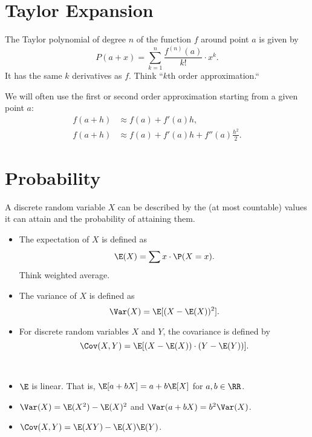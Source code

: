 \documentclass[oneside,reqno,letterpaper]{amsart}
\begin{document}
\section{Taylor Expansion}
\begin{definition}
  The Taylor polynomial of degree \(n\) of the function \(f\) around point \(a\) is given by 
  \[
    P(a + x) = \sum_{k = 1}^{n} \frac{f^{(n)}(a)}{k!} \cdot x^{k} . 
  \] 
  It has the same \(k\) derivatives as \(f\). 
  Think ``\(k\)th order approximation.``
\end{definition}
\begin{remark}
  We will often use the first or second order approximation starting from a given point \(a\):
  \begin{align*}
    f(a + h) &\approx f(a) + f'(a) h, \\
    f(a + h) &\approx f(a) + f'(a) h + f''(a) \frac{h^2}{2} . 
  \end{align*}
\end{remark}



\section{Probability}
\begin{definition}
  A discrete random variable \(X\) can be described by the (at most countable) values it can attain and the probability of attaining them.

  \begin{itemize}
  \item 
    The expectation of \(X\) is defined as 
    \[
      \E(X) = \sum x \cdot \P(X = x) . 
    \] 
    Think weighted average. 

  \item 
    The variance of \(X\) is defined as 
    \[
      \Var(X) = \E[(X - \E(X))^2] . 
    \] 

  \item For discrete random variables \(X\) and \(Y\), the covariance is defined by
    \[
      \Cov(X, Y) = \E[(X - \E(X)) \cdot (Y - \E(Y))] .
    \] 
  \end{itemize}
\end{definition}

\begin{proposition}~
  \begin{itemize}
    \item \(\E\) is linear. 
      That is, \(\E[a + bX] = a + b \E[X]\) for \(a, b \in \RR\). 
    \item \(\Var(X) = \E(X^2) - \E(X)^2\) and 
      \(\Var(a + bX) = b^2 \Var(X)\). 
    \item \(\Cov(X, Y) = \E(XY) - \E(X) \E(Y)\). 
  \end{itemize}
\end{proposition}
\end{document}
